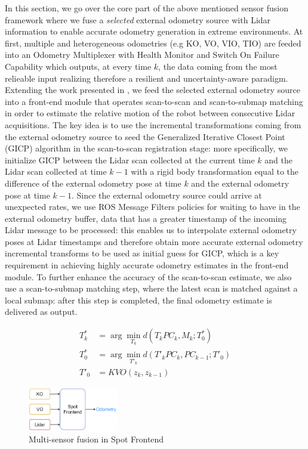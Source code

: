 \documentclass[a4paper, 10pt, conference]{ieeeconf}      %
\begin{document}
In this section, we go over the core part of the above mentioned sensor fusion framework where we fuse a \emph{selected} external odometry source with Lidar information to enable accurate odometry generation in extreme environments. At first, multiple and heterogeneous odometries (e.g KO, VO, VIO, TIO) are feeded into an Odometry Multiplexer with Health Monitor and Switch On Failure Capability \cite{Santamaria-navarro2019} which outputs, at every time $k$, the data coming from the most relieable input realizing therefore a resilient and uncertainty-aware paradigm. Extending the work presented in \cite{Ebadi2020}, we feed the selected external odometry source into a front-end module that operates scan-to-scan and scan-to-submap matching in order to estimate the relative motion of the robot between consecutive Lidar acquisitions. The key idea is to use the incremental transformations coming from the external odometry source to seed the Generalized Iterative Closest Point (GICP) algorithm in the scan-to-scan registration stage: more specifically, we initialize GICP between the Lidar scan collected at the current time $k$ and the Lidar scan collected at time $k-1$ with a rigid body transformation equal to the difference of the external odometry pose at time $k$ and the external odometry pose at time $k-1$. Since the external odometry source could arrive at unexpected rates, we use ROS Message Filters policies for waiting to have in the external odometry buffer, data that has a greater timestamp of the incoming Lidar message to be processed: this enables us to interpolate external odometry poses at Lidar timestamps and therefore obtain more accurate external odometry incremental transforms to be used as initial guess for GICP, which is a key requirement in achieving highly accurate odometry estimates in the front-end module. To further enhance the accuracy of the scan-to-scan estimate, we also use a scan-to-submap matching step, where the latest scan is matched against a local submap: after this step is completed, the final odometry estimate is delivered as output. 

\begin{align}
    T^*_k &= \arg\min_{T_k} d(T_k PC_k, M_k; T^*_0) \\
    T^*_0 &= \arg\min_{T'_k} d(T'_k PC_k, PC_{k-1}; T'_0)\\
    T'_0 &= KVO(z_k, z_{k-1})    
\end{align}

\begin{figure}[thpb]
  \centering
  \includegraphics[width=0.35\textwidth]{spot_iros/graphics/spot_spot_frontend.PNG}
  \caption{Multi-sensor fusion in Spot Frontend}
  \label{fig:spot_frontend}
\end{figure}
\end{document}
